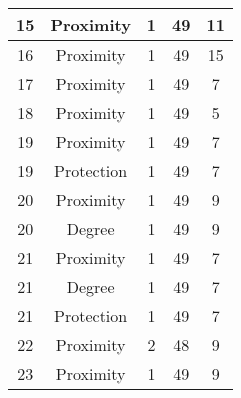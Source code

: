 \documentclass[results.tex]{subfiles}
\begin{document}
\begin{center}
\begin{tabular}{| c || c | c | c | c |}
            \hline
            15                      & Proximity                    & 1                      & 49                      & 11                   \\
            \hline
            16                      & Proximity                    & 1                      & 49                      & 15                   \\
            \hline
            17                      & Proximity                    & 1                      & 49                      & 7                    \\
            \hline
            18                      & Proximity                    & 1                      & 49                      & 5                    \\
            \hline
            19                      & Proximity                    & 1                      & 49                      & 7                    \\
            \hline
            19                      & Protection                   & 1                      & 49                      & 7                    \\
            \hline
            20                      & Proximity                    & 1                      & 49                      & 9                    \\
            \hline
            20                      & Degree                       & 1                      & 49                      & 9                    \\
            \hline
            21                      & Proximity                    & 1                      & 49                      & 7                    \\
            \hline
            21                      & Degree                       & 1                      & 49                      & 7                    \\
            \hline
            21                      & Protection                   & 1                      & 49                      & 7                    \\
            \hline
            22                      & Proximity                    & 2                      & 48                      & 9                    \\
            \hline
            23                      & Proximity                    & 1                      & 49                      & 9                    \\

\end{tabular}
\end{center}
\end{document}
